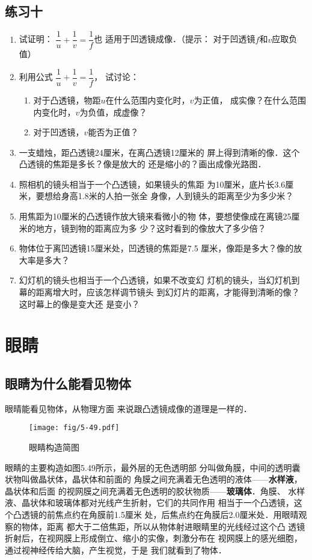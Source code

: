 \subsection*{练习十}

\begin{enumerate}
    \item 试证明：
$\dfrac{1}{u}+\dfrac{1}{v}=\dfrac{1}{f}$也
适用于凹透镜成像．（提示：
对于凹透镜$f$和$v$应取负值）
\item  利用公式
$\dfrac{1}{u}+\dfrac{1}{v}=\dfrac{1}{f}$，
试讨论：
\begin{enumerate}
    \item 对于凸透镜，物距$u$在什么范围内变化时，$v$为正值，
    成实像？在什么范围内变化时，$v$为负值，成虚像？
    \item 对于凹透镜，$v$能否为正值？
\end{enumerate}
\item 一支蜡烛，距凸透镜24厘米，在离凸透镜12厘米的
屏上得到清晰的像．这个凸透镜的焦距是多长？像是放大的
还是缩小的？画出成像光路图．
\item 照相机的镜头相当于一个凸透镜，如果镜头的焦距
为10厘米，底片长3.6厘米，要想给身高1.8米的人拍一张全
身像，人到镜头的距离至少为多少米？
\item 用焦距为10厘米的凸透镜作放大镜来看微小的物
体，要想使像成在离镜25厘米的地方，镜到物的距离应为多
少？这时看到的像放大了多少倍？
\item 物体位于离凹透镜15厘米处，凹透镜的焦距是7.5
厘米，像距是多大？像的放大率是多大？
\item 幻灯机的镜头也相当于一个凸透镜，如果不改变幻
灯机的镜头，当幻灯机到幕的距离增大时，应该怎样调节镜头
到幻灯片的距离，才能得到清晰的像？这时幕上的像是变大还
是变小？
\end{enumerate}

\section{眼睛}
\subsection{眼睛为什么能看见物体}

眼晴能看见物体，从物理方面
来说跟凸透镜成像的道理是一样的．
\begin{figure}[htp]\centering
    \texttt{[image: fig/5-49.pdf]}
    \caption{眼睛构造简图}
    \end{figure}

眼睛的主要构造如图5.49所示，最外层的无色透明部
分叫做角膜，中间的透明囊状物叫做晶状体，晶状体和前面的
角膜之间充满着无色透明的液体——\textbf{水样液}，晶状体和后面
的视网膜之间充满着无色透明的胶状物质——\textbf{玻璃体}．角膜、
水样液、晶状体和玻璃体都对光线产生折射，它们的共同作用
相当于一个凸透镜，这个凸透镜的前焦点约在角膜前1.5厘米
处，后焦点约在角膜后2.0厘米处．用眼晴观察的物体，距离
都大于二倍焦距，所以从物体射进眼睛里的光线经过这个凸
透镜折射后，在视网膜上形成倒立、缩小的实像，刺激分布在
视网膜上的感光细胞，通过视神经传给大脑，产生视觉，于是
我们就看到了物体．

